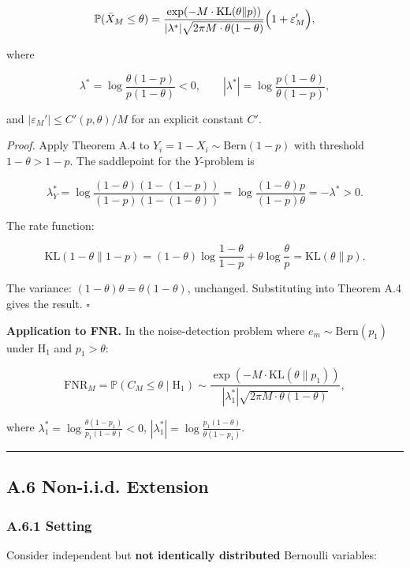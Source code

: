 \documentclass[
  12pt,
]{article}
\begin{document}
\[
\mathbb{P}(\bar{X}_M \leq \theta) = \frac{\exp(-M \cdot \text{KL}(\theta \| p))}
{|\lambda^*| \sqrt{2\pi M \cdot \theta(1-\theta)}}
\Bigl(1 + \varepsilon_M'\Bigr),
\]

where

\[\lambda^* = \log\frac{\theta(1-p)}{p(1-\theta)} < 0, \qquad
|\lambda^*| = \log\frac{p(1-\theta)}{\theta(1-p)},\]

and \(|\varepsilon_M'| \leq C'(p,\theta)/M\) for an explicit constant
\(C'\).

\emph{Proof.} Apply Theorem A.4 to \(Y_i = 1-X_i \sim \text{Bern}(1-p)\)
with threshold \(1-\theta > 1-p\). The saddlepoint for the \(Y\)-problem
is

\[\lambda_Y^* = \log\frac{(1-\theta)(1-(1-p))}{(1-p)(1-(1-\theta))}
= \log\frac{(1-\theta)p}{(1-p)\theta} = -\lambda^* > 0.\]

The rate function:

\[\text{KL}(1-\theta\|1-p) = (1-\theta)\log\frac{1-\theta}{1-p} + \theta\log\frac{\theta}{p} = \text{KL}(\theta\|p).\]

The variance: \((1-\theta)\theta = \theta(1-\theta)\), unchanged.
Substituting into Theorem A.4 gives the result. \(\square\)

\textbf{Application to FNR.} In the noise-detection problem where
\(e_m \sim \text{Bern}(p_1)\) under H\(_1\) and \(p_1 > \theta\):

\[\text{FNR}_M = \mathbb{P}(C_M \leq \theta \mid \text{H}_1) \sim
\frac{\exp(-M \cdot \text{KL}(\theta \| p_1))}{|\lambda_1^*| \sqrt{2\pi M \cdot \theta(1-\theta)}},\]

where \(\lambda_1^* = \log\frac{\theta(1-p_1)}{p_1(1-\theta)} < 0\),
\(|\lambda_1^*| = \log\frac{p_1(1-\theta)}{\theta(1-p_1)}\).

\begin{center}\rule{0.5\linewidth}{0.5pt}\end{center}

\subsection{A.6 Non-i.i.d. Extension}\label{a.6-non-i.i.d.-extension}

\subsubsection{A.6.1 Setting}\label{a.6.1-setting}

Consider independent but \textbf{not identically distributed} Bernoulli
variables:
\end{document}

